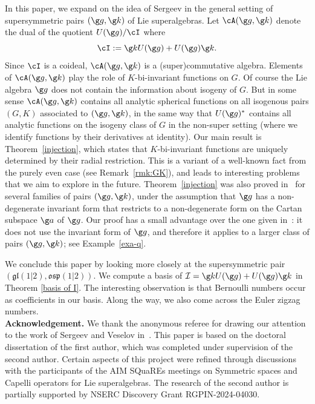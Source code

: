 \documentclass[11pt]{amsart}
\begin{document}
In this paper, we expand on the idea of Sergeev in the general setting of supersymmetric pairs $(\g g,\g k)$ of Lie superalgebras. Let $\cA(\g g,\g k)$ denote the dual of the quotient
$U(\g g)/\cI$ where \[
\cI:=\g kU(\g g)+U(\g g)\g k.
\] Since $\cI$ is a coideal, $\cA(\g g,\g k)$ is a (super)commutative algebra. Elements of $\cA(\g g,\g k)$ play the role of $K$-bi-invariant functions on $G$. Of course the Lie algebra $\g g$ does not contain the information about isogeny of $G$.  But  
in some sense $\cA(\g g,\g k)$ contains all analytic spherical functions on all isogenous pairs $(G,K)$ associated to $(\g g,\g k)$, in the same way that $U(\g g)^*$ contains all analytic functions  
on the isogeny class of $G$
 in the non-super setting (where we identify functions by their derivatives at  identity). 
Our main result is Theorem~\ref{injection}, which states that $K$-bi-invariant functions are uniquely determined by their radial restriction. This is a variant of a well-known fact 
from the purely even case (see Remark~\ref{rmk:GK}), and leads to interesting problems that we aim to explore in the future. 
Theorem~\ref{injection} was also proved in~\cite[Theorem 4.1]{SergeevVeselovSym} for several families of pairs $(\g g,\g k)$, under the assumption that $\g g$ has a non-degenerate invariant form that restricts to a non-degenerate form on the Cartan subspace $\g a$ of $\g g$. Our proof has a small advantage over the one given in~\cite{SergeevVeselovSym}: it does not use the invariant form of $\g g$, and therefore it applies to a larger class of pairs $(\g g,\g k)$; see Example~\ref{exa-q}.

We conclude this paper by looking more closely at  the supersymmetric pair $(\mathfrak{gl}(1|2), \mathfrak{osp}(1|2))$. We compute a basis of $\mathcal{I}=\g k U(\g g)+U(\g g)\g k$ in Theorem \ref{basis of I}. The interesting observation is that  Bernoulli  numbers occur as coefficients in our basis. Along the way, we also come across the Euler zigzag numbers. \\

\noindent\textbf{Acknowledgement.} We thank the anonymous referee for drawing our attention to the work of Sergeev and Veselov in~\cite{SergeevVeselovSym}. This paper is based on the doctoral dissertation of the first author, which was completed under supervision of the second author. Certain aspects of this project were refined through  discussions with 
the participants of the AIM SQuaREs meetings on 
Symmetric spaces and Capelli operators for Lie superalgebras.  
 The research of the second author is partially supported by NSERC Discovery Grant RGPIN-2024-04030.
\end{document}
